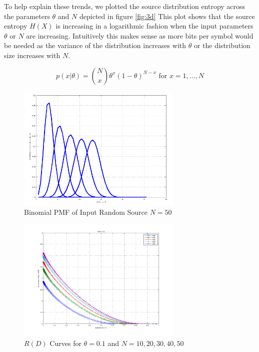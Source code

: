 \documentclass[journal]{IEEEtran}
\begin{document}
\par To help explain these trends, we plotted the source distribution entropy across the parameters \(\theta\) and \(N\) depicted in figure \ref{fig:3d} This plot shows that the source entropy \(H(X)\) is increasing in a logarithmic fashion when the input parameters \(\theta\) or \(N\) are increasing. Intuitively this makes sense as more bits per symbol would be needed as the variance of the distribution increases with \(\theta\) or the distribution size increases with \(N\).

\begin{equation}
\label{eq:bernoulli}
p(x|\theta) = {N \choose x}\theta^x(1-\theta)^{N-x} \text{  for  } x=1,\dots,N
\end{equation}

\begin{figure}[!h]
\centering
\includegraphics[width=3.1in]{../images/binomialdist.png}
\caption{Binomial PMF of Input Random Source \(N=50\)}
\label{fig:binomialdist}
\end{figure}


\begin{figure}[!h]
\centering
\includegraphics[width=3.1in]{../images/plot_1.png}
\caption{\(R(D)\) Curves for \(\theta=0.1\) and \(N={ {10,20,30,40,50} }\)}
\label{fig:theta_1}
\end{figure}
\end{document}
